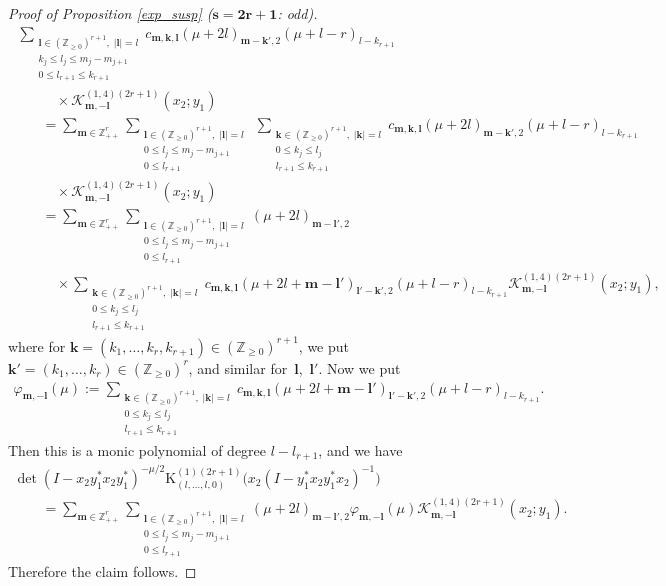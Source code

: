 \documentclass[pdftex]{sigma}
\numberwithin{equation}{section}
\newcommand{\bk}{\mathbf{k}}
\newcommand{\bl}{\mathbf{l}}
\newcommand{\bm}{\mathbf{m}}
\newcommand{\BZ}{\mathbb{Z}}
\newcommand{\cK}{\mathcal{K}}
\newcommand{\rK}{\mathrm{K}}
\begin{document}
\begin{proof}[Proof of Proposition \ref{exp_susp} ($\boldsymbol{s=2r+1}$: odd)]
\begin{gather*}
\;\sum_{\substack{\bl\in(\BZ_{\ge 0})^{r+1},\; |\bl|=l\\ k_j\le l_j\le m_j-m_{j+1}\\ 0\le l_{r+1}\le k_{r+1}}}
c_{\bm,\bk,\bl}(\mu+2l)_{\bm-\bk',2}(\mu+l-r)_{l-k_{r+1}}\\
\qquad\quad{} \times\cK_{\bm,-\bl}^{(1,4)(2r+1)}(x_2;y_1) \\
\qquad{} =\sum_{\bm\in\BZ_{++}^r}\sum_{\substack{\bl\in(\BZ_{\ge 0})^{r+1},\; |\bl|=l\\ 0\le l_j\le m_j-m_{j+1}\\ 0\le l_{r+1}}}
\;\sum_{\substack{\bk\in(\BZ_{\ge 0})^{r+1},\; |\bk|=l\\ 0\le k_j\le l_j\\ l_{r+1}\le k_{r+1}}}
c_{\bm,\bk,\bl}(\mu+2l)_{\bm-\bk',2}(\mu+l-r)_{l-k_{r+1}}\\
\qquad\quad{} \times\cK_{\bm,-\bl}^{(1,4)(2r+1)}(x_2;y_1) \\
\qquad{}=\sum_{\bm\in\BZ_{++}^r}\sum_{\substack{\bl\in(\BZ_{\ge 0})^{r+1},\; |\bl|=l\\ 0\le l_j\le m_j-m_{j+1}\\ 0\le l_{r+1}}}(\mu+2l)_{\bm-\bl',2}\\
\qquad\quad{} \times\sum_{\substack{\bk\in(\BZ_{\ge 0})^{r+1},\; |\bk|=l\\ 0\le k_j\le l_j\\ l_{r+1}\le k_{r+1}}}
c_{\bm,\bk,\bl}(\mu+2l+\bm-\bl')_{\bl'-\bk',2}(\mu+l-r)_{l-k_{r+1}}\cK_{\bm,-\bl}^{(1,4)(2r+1)}(x_2;y_1),
\end{gather*}
where for $\bk=(k_1,\ldots,k_r,k_{r+1})\in(\BZ_{\ge 0})^{r+1}$, we put $\bk'=(k_1,\ldots,k_r)\in(\BZ_{\ge 0})^r$, and similar for~$\bl$,~$\bl'$. Now we put
\begin{gather*} \varphi_{\bm,-\bl}(\mu):=\sum_{\substack{\bk\in(\BZ_{\ge 0})^{r+1},\; |\bk|=l\\ 0\le k_j\le l_j\\ l_{r+1}\le k_{r+1}}}
c_{\bm,\bk,\bl}(\mu+2l+\bm-\bl')_{\bl'-\bk',2}(\mu+l-r)_{l-k_{r+1}}. \end{gather*}
Then this is a monic polynomial of degree $l-l_{r+1}$, and we have
\begin{gather*}
 \det(I-x_2y_1^*x_2y_1^*)^{-\mu/2}\rK_{(l,\ldots,l,0)}^{(1)(2r+1)}\big(x_2(I-y_1^*x_2y_1^*x_2)^{-1}\big) \\
\qquad{} =\sum_{\bm\in\BZ_{++}^r}\sum_{\substack{\bl\in(\BZ_{\ge 0})^{r+1},\; |\bl|=l\\ 0\le l_j\le m_j-m_{j+1}\\ 0\le l_{r+1}}}
(\mu+2l)_{\bm-\bl',2}\varphi_{\bm,-\bl}(\mu)\cK_{\bm,-\bl}^{(1,4)(2r+1)}(x_2;y_1).
\end{gather*}
Therefore the claim follows.
\end{proof}
\end{document}

